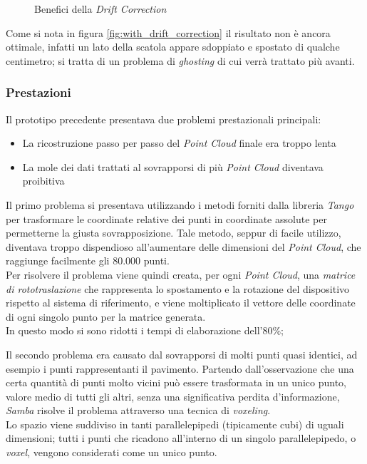\begin{figure}[htp] 
    \centering
    \hfill%
    \caption{Benefici della \emph{Drift Correction}}
\end{figure}
\newline
Come si nota in figura \ref{fig:with_drift_correction} il risultato non è ancora ottimale, infatti un lato della scatola appare sdoppiato e spostato di qualche centimetro; si tratta di un problema di \emph{ghosting} di cui verrà trattato più avanti.

\subsubsection{Prestazioni}
Il prototipo precedente presentava due problemi prestazionali principali:
\begin{itemize}
\item La ricostruzione passo per passo del \emph{Point Cloud} finale era troppo lenta
\item La mole dei dati trattati al sovrapporsi di più \emph{Point Cloud} diventava proibitiva
\end{itemize}
\noindent
Il primo problema si presentava utilizzando i metodi forniti dalla libreria \emph{Tango} per trasformare le coordinate relative dei punti in coordinate assolute per permetterne la giusta sovrapposizione. Tale metodo, seppur di facile utilizzo, diventava troppo dispendioso all'aumentare delle dimensioni del \emph{Point Cloud}, che raggiunge facilmente gli 80.000 punti.\\
Per risolvere il problema viene quindi creata, per ogni \emph{Point Cloud}, una \emph{matrice di rototraslazione} che rappresenta lo spostamento e la rotazione del dispositivo rispetto al sistema di riferimento, e viene moltiplicato il vettore delle coordinate di ogni singolo punto per la matrice generata. \\
In questo modo si sono ridotti i tempi di elaborazione dell'80\%;

Il secondo problema era causato dal sovrapporsi di molti punti quasi identici, ad esempio i punti rappresentanti il pavimento. Partendo dall'osservazione che una certa quantità di punti molto vicini può essere trasformata in un unico punto, valore medio di tutti gli altri, senza una significativa perdita d'informazione, \emph{Samba} risolve il problema attraverso una tecnica di \emph{voxeling}.\\
Lo spazio viene suddiviso in tanti parallelepipedi (tipicamente cubi) di uguali dimensioni; tutti i punti che ricadono all'interno di un singolo parallelepipedo, o \emph{voxel}, vengono considerati come un unico punto.

